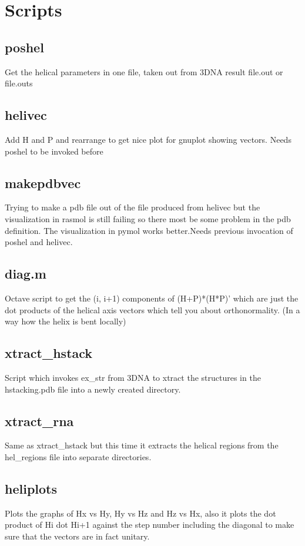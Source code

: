 \section{Scripts}

\subsection{poshel}

Get the helical parameters in one file, taken out from 3DNA result file.out or file.outs

\subsection{helivec}

Add H and P and rearrange to get nice plot for gnuplot showing vectors. Needs poshel 
to be invoked before


\subsection{makepdbvec}

Trying to make a pdb file out of the file produced from helivec but the visualization
in rasmol is still failing so there most be some problem in the pdb definition. The visualization 
in pymol works better.Needs previous invocation of poshel and helivec.

\subsection{diag.m}

Octave script to get the (i, i+1) components of (H+P)*(H*P)' which are just the dot products of 
the helical axis vectors which tell you about orthonormality. (In a way how the helix
is bent locally)

\subsection{xtract\_hstack}

Script which invokes ex\_str from 3DNA to xtract the structures in the hstacking.pdb file into a
newly created directory.

\subsection{xtract\_rna}

Same as xtract\_hstack but this time it extracts the helical regions from the hel\_regions file into 
separate directories.

\subsection{heliplots}

Plots the graphs of Hx vs Hy, Hy vs Hz and Hz vs Hx, also it plots the dot product of 
Hi dot Hi+1 against the step number including the diagonal to make sure that the vectors
are in fact unitary.
